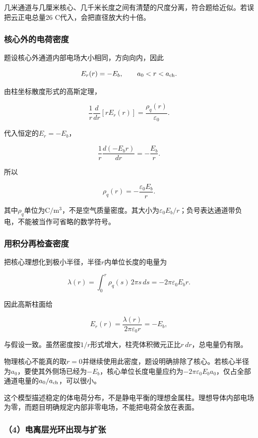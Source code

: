 \documentclass[12pt,a4paper,fontset=fandol]{ctexart}
\begin{document}
几米通道与几厘米核心、几千米长度之间有清楚的尺度分离，符合题给近似。若误把云正电总量26
C代入，会把直径放大约十倍。

\subsubsection{核心外的电荷密度}\label{ux6838ux5fc3ux5916ux7684ux7535ux8377ux5bc6ux5ea6}

题设核心外通道内部电场大小相同，方向向内，因此

\[
E_r(r)=-E_b,
\qquad a_0<r<a_{\rm ch}.
\]

由柱坐标散度形式的高斯定理，

\[
\frac1r\frac{d}{dr}[rE_r(r)]
=\frac{\rho_q(r)}{\varepsilon_0}.
\]

代入恒定的\(E_r=-E_b\)，

\[
\frac1r\frac{d(-E_br)}{dr}
=-\frac{E_b}{r}.
\]

所以

\[
\boxed{\rho_q(r)=-\frac{\varepsilon_0E_b}{r}}.
\]

其中\(\rho_q\)单位为\(\mathrm{C/m^3}\)，不是空气质量密度。其大小为\(\varepsilon_0E_b/r\)；负号表达通道带负电，不能被当作可省略的数学符号。

\subsubsection{用积分再检查密度}\label{ux7528ux79efux5206ux518dux68c0ux67e5ux5bc6ux5ea6}

把核心理想化到极小半径，半径\(r\)内单位长度的电量为

\[
\lambda(r)=\int_0^r
\rho_q(s)\,2\pi s\,ds
=-2\pi\varepsilon_0E_br.
\]

因此高斯柱面给

\[
E_r(r)=\frac{\lambda(r)}
{2\pi\varepsilon_0r}=-E_b,
\]

与假设一致。虽然密度按\(1/r\)形式增大，柱壳体积微元正比\(r\,dr\)，总电量仍有限。

物理核心不能真的取\(r=0\)并继续使用此密度，题设明确排除了核心。若核心半径为\(a_0\)，要使其外侧场已经为\(-E_b\)，核心单位长度电量应约为\(-2\pi\varepsilon_0E_ba_0\)，仅占全部通道电量的\(a_0/a_{\rm ch}\)，可以很小。

这个模型描述稳定的体电荷分布，不是静电平衡的理想金属柱。理想导体内部电场为零，而题目明确规定内部非零电场，不能把电荷全放在表面。

\subsubsection{（4）电离层光环出现与扩张}\label{ux7535ux79bbux5c42ux5149ux73afux51faux73b0ux4e0eux6269ux5f20}
\end{document}
